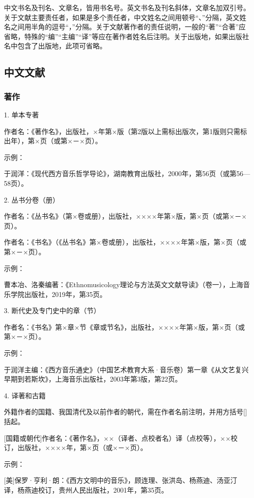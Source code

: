 中文书名及刊名、文章名，皆用书名号。英文书名及刊名斜体，文章名加双引号。关于文献主要责任者，如果是多个责任者，中文姓名之间用顿号“、”分隔，英文姓名之间用半角的逗号“，”分隔。关于文献著作者的责任说明，一般的“著”“合著”应省略，特殊的“编”“主编”“译”等应在著作者姓名后注明。关于出版地，如果出版社名中包含了出版地，此项可省略。

\subsection{中文文献}

\subsubsection{著作}

1. 单本专著

作者名：《著作名》，出版社，×年第×版（第2版以上需标出版次，第1版则只需标出年），第×页（或第×－×页）。

示例：

于润洋：《现代西方音乐哲学导论》，湖南教育出版社，2000年，第56页（或第56—58页）。

2. 丛书分卷（册）

作者名：《丛书名》（第×卷或册），出版社，××××年第×版，第×页（或第×－×页）。

作者名：《书名》（《丛书名》第×卷或册），出版社，××××年第×版，第×页（或第×－×页）。

示例：

曹本冶、洛秦编著：《Ethnomusicology理论与方法英文文献导读》（卷一），上海音乐学院出版社，2019年，第35页。

3. 断代史及专门史中的章（节）

作者名：《书名》第×章×节《章或节名》，出版社，××××年第×版，第×页（或第×－×页）。

示例：

于润洋主编：《西方音乐通史》（中国艺术教育大系·音乐卷）第一章《从文艺复兴早期到若斯坎》，上海音乐出版社，2003年第3版，第22页。

4. 译著和古籍

外籍作者的国籍、我国清代及以前作者的朝代，需在作者名前注明，并用方括号[]括起。

[国籍或朝代]作者名：《著作名》，××（译者、点校者名）译（点校等），××校订，出版社，××××年，第×页（或×－×页）。

示例：

[美]保罗·亨利·朗：《西方文明中的音乐》，顾连理、张洪岛、杨燕迪、汤亚汀译，杨燕迪校订，贵州人民出版社，2001年，第35页。

